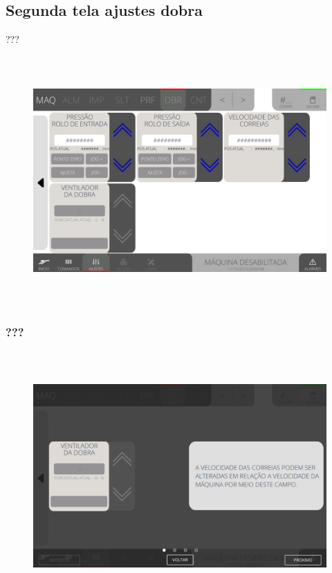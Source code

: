 \newpage
\thispagestyle{fancy}
\vspace*{\fill}
\subsection{Segunda tela ajustes dobra}
 ???
\begin{figure}[h]
  \centering
  \includegraphics[width=576px,height=360px]{src/imagesFlexo/07-fold/settings/e-Tela-Principal-2.png}
   \label{}
\end{figure}

\newpage
\thispagestyle{fancy}
\vspace*{\fill}
\subsubsection{\small{???}}
\begin{figure}[h]
  \centering
  \includegraphics[width=576px,height=360px]{src/imagesFlexo/07-fold/settings/e-6.png}
   \label{}
\end{figure}
\vspace*{\fill}

